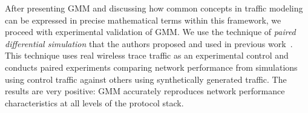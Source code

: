 \documentclass[twocolumn,final]{svjour3}
\newcommand{\caps}[1]{{\small{#1}}}
\begin{document}
After presenting \caps{GMM} and discussing how common concepts in traffic modeling can be expressed in precise mathematical terms within this framework, we proceed with experimental validation of \caps{GMM}. We use the technique of \textit{paired differential simulation} that the authors proposed and used in previous work~\cite{Karpinski07:realism,Karpinski07:cbr-failure}. This technique uses real wireless trace traffic as an experimental control and conducts paired experiments comparing network performance from simulations using control traffic against others using synthetically generated traffic. The results are very positive: \caps{GMM} accurately reproduces network performance characteristics at all levels of the protocol stack.


\end{document}
